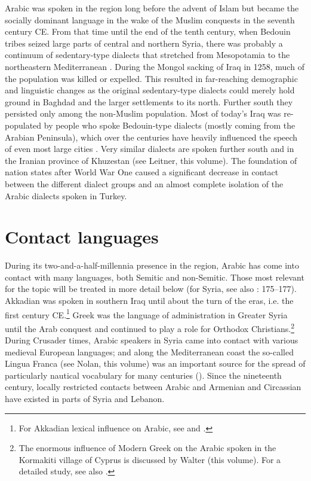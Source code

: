 \documentclass[output=paper]{langsci/langscibook}
\begin{document}
Arabic was spoken in the region long before the advent of Islam \citep[95]{Donner1981} but became the socially dominant language in the wake of the Muslim conquests in the seventh century CE. From that time until the end of the tenth century, when Bedouin tribes seized large parts of central and northern Syria, there was probably a continuum of sedentary-type dialects that stretched from Mesopotamia to the northeastern Mediterranean \citep[291]{Procházka2018Fertile}. During the Mongol sacking of Iraq in 1258, much of the population was killed or expelled. This resulted in far-reaching demographic and linguistic changes as the original sedentary-type dialects could merely hold ground in Baghdad and the larger settlements to its north. Further south they persisted only among the non-Muslim population. Most of today’s Iraq was re-populated by people who spoke Bedouin-type dialects (mostly coming from the Arabian Peninsula), which over the centuries have heavily influenced the speech of even most large cities \citep{Holes2007}. Very similar dialects are spoken further south and in the Iranian province of Khuzestan (see Leitner, this volume). The foundation of nation states after World War One caused a significant decrease in contact between the different dialect groups and an almost complete isolation of the Arabic dialects spoken in Turkey.

\section{Contact languages} 

During its two-and-a-half-millennia presence in the region, Arabic has come into contact with many languages, both Semitic and non-Semitic. Those most relevant for the topic will be treated in more detail below (for Syria, see also \citealt{Barbot1961}: 175--177). Akkadian was spoken in southern Iraq until about the turn of the eras, i.e. the first century CE.\footnote{For Akkadian lexical influence on Arabic, see \citet{Holes2002} and \citet{Krebernik2008}.} Greek was the language of administration in Greater Syria until the Arab conquest \citep[185--187]{Magidow2013} and continued to play a role for Orthodox Christians.\footnote{The enormous influence of Modern Greek on the Arabic spoken in the Kormakiti village of Cyprus is discussed by Walter (this volume). For a detailed study, see also \citet{Borg1985}.} During Crusader times, Arabic speakers in Syria came into contact with various medieval European languages; and along the Mediterranean coast the so-called Lingua Franca (see Nolan, this volume) was an important source for the spread of particularly nautical vocabulary for many centuries (\citealt{KahaneKahaneTietze1958}). Since the nineteenth century, locally restricted contacts between Arabic and Armenian and Circassian have existed in parts of Syria and Lebanon. 
\end{document}
